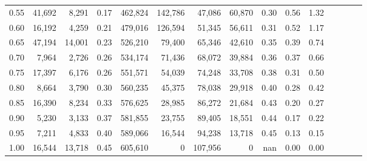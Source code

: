 \begin{tabular}{rrrcrrrrrrrrrrr}
0.55 &  41,692 &   8,291 &                                       0.17 &  462,824 &  142,786 &   47,086 &   60,870 &  0.30 &  0.56 &                         1.32 \\
0.60 &  16,192 &   4,259 &                                       0.21 &  479,016 &  126,594 &   51,345 &   56,611 &  0.31 &  0.52 &                         1.17 \\
0.65 &  47,194 &  14,001 &                                       0.23 &  526,210 &   79,400 &   65,346 &   42,610 &  0.35 &  0.39 &                         0.74 \\
0.70 &   7,964 &   2,726 &                                       0.26 &  534,174 &   71,436 &   68,072 &   39,884 &  0.36 &  0.37 &                         0.66 \\
0.75 &  17,397 &   6,176 &                                       0.26 &  551,571 &   54,039 &   74,248 &   33,708 &  0.38 &  0.31 &                         0.50 \\
0.80 &   8,664 &   3,790 &                                       0.30 &  560,235 &   45,375 &   78,038 &   29,918 &  0.40 &  0.28 &                         0.42 \\
0.85 &  16,390 &   8,234 &                                       0.33 &  576,625 &   28,985 &   86,272 &   21,684 &  0.43 &  0.20 &                         0.27 \\
0.90 &   5,230 &   3,133 &                                       0.37 &  581,855 &   23,755 &   89,405 &   18,551 &  0.44 &  0.17 &                         0.22 \\
0.95 &   7,211 &   4,833 &                                       0.40 &  589,066 &   16,544 &   94,238 &   13,718 &  0.45 &  0.13 &                         0.15 \\
1.00 &  16,544 &  13,718 &                                       0.45 &  605,610 &        0 &  107,956 &        0 &   nan &  0.00 &                         0.00 \\
\bottomrule
\end{tabular}
